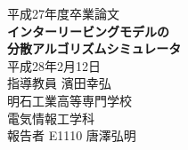 
\begin{titlepage}
	\centering
	\vspace*{3.5cm}
	{\huge 平成27年度卒業論文}
	\vspace{1.5cm} \\
	{\huge \textbf{インターリービングモデルの \\ 分散アルゴリズムシミュレータ}}
	\vspace{5cm} \\
	{\LARGE 平成28年2月12日}
	\vspace{1.0cm} \\
	{\LARGE 指導教員  濱田幸弘}
	\vspace{3.5cm} \\
	{\LARGE 明石工業高等専門学校}
	\vspace{1.0cm} \\
	{\LARGE 電気情報工学科}
	\vspace{1.0cm} \\
	{\LARGE 報告者  E1110 唐澤弘明}
\end{titlepage}
